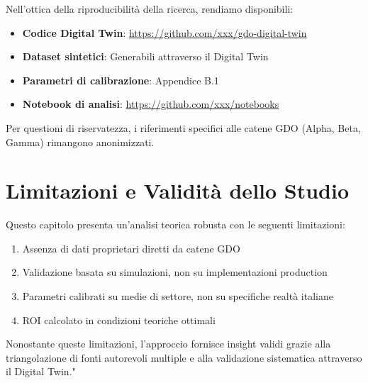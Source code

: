 Nell'ottica della riproducibilità della ricerca, rendiamo disponibili:
\begin{itemize}
    \item \textbf{Codice Digital Twin}: \url{https://github.com/xxx/gdo-digital-twin}
    \item \textbf{Dataset sintetici}: Generabili attraverso il Digital Twin
    \item \textbf{Parametri di calibrazione}: Appendice B.1
    \item \textbf{Notebook di analisi}: \url{https://github.com/xxx/notebooks}
\end{itemize}

Per questioni di riservatezza, i riferimenti specifici alle catene 
GDO (Alpha, Beta, Gamma) rimangono anonimizzati.

\section{\textbf{Limitazioni e Validità dello Studio}}

Questo capitolo presenta un'analisi teorica robusta con le seguenti limitazioni:
\begin{enumerate}
    \item Assenza di dati proprietari diretti da catene GDO
    \item Validazione basata su simulazioni, non su implementazioni production
    \item Parametri calibrati su medie di settore, non su specifiche realtà italiane
    \item ROI calcolato in condizioni teoriche ottimali
\end{enumerate}

Nonostante queste limitazioni, l'approccio fornisce insight validi 
grazie alla triangolazione di fonti autorevoli multiple e alla 
validazione sistematica attraverso il Digital Twin."

\clearpage
\printbibliography[
    heading=subbibliography,
    title={Riferimenti Bibliografici del Capitolo 2},
]

\endrefsection